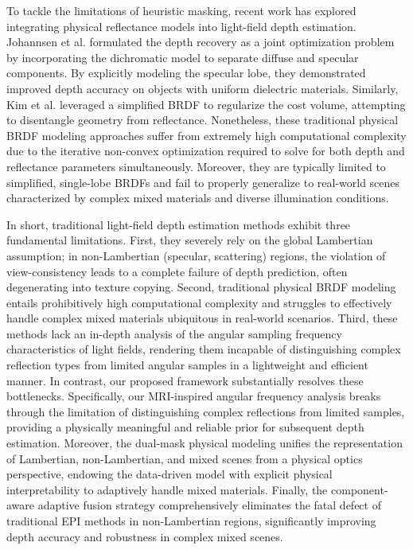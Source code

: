 To tackle the limitations of heuristic masking, recent work has explored integrating physical reflectance models into light-field depth estimation. Johannsen et al. \cite{Johannsendepthestimationand} formulated the depth recovery as a joint optimization problem by incorporating the dichromatic model to separate diffuse and specular components. By explicitly modeling the specular lobe, they demonstrated improved depth accuracy on objects with uniform dielectric materials. Similarly, Kim et al. \cite{KimdepthestimationofnonLa} leveraged a simplified BRDF to regularize the cost volume, attempting to disentangle geometry from reflectance. Nonetheless, these traditional physical BRDF modeling approaches suffer from extremely high computational complexity due to the iterative non-convex optimization required to solve for both depth and reflectance parameters simultaneously. Moreover, they are typically limited to simplified, single-lobe BRDFs and fail to properly generalize to real-world scenes characterized by complex mixed materials and diverse illumination conditions.

In short, traditional light-field depth estimation methods exhibit three fundamental limitations. First, they severely rely on the global Lambertian assumption; in non-Lambertian (specular, scattering) regions, the violation of view-consistency leads to a complete failure of depth prediction, often degenerating into texture copying. Second, traditional physical BRDF modeling entails prohibitively high computational complexity and struggles to effectively handle complex mixed materials ubiquitous in real-world scenarios. Third, these methods lack an in-depth analysis of the angular sampling frequency characteristics of light fields, rendering them incapable of distinguishing complex reflection types from limited angular samples in a lightweight and efficient manner. In contrast, our proposed framework substantially resolves these bottlenecks. Specifically, our MRI-inspired angular frequency analysis breaks through the limitation of distinguishing complex reflections from limited samples, providing a physically meaningful and reliable prior for subsequent depth estimation. Moreover, the dual-mask physical modeling unifies the representation of Lambertian, non-Lambertian, and mixed scenes from a physical optics perspective, endowing the data-driven model with explicit physical interpretability to adaptively handle mixed materials. Finally, the component-aware adaptive fusion strategy comprehensively eliminates the fatal defect of traditional EPI methods in non-Lambertian regions, significantly improving depth accuracy and robustness in complex mixed scenes.

